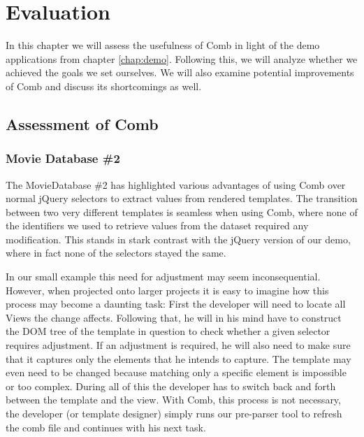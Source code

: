 \documentclass[thesis.tex]{subfiles}
\begin{document}
\chapter{Evaluation}
\label{chap:eval}


In this chapter we will assess the usefulness of Comb in light of the
demo applications from chapter \ref{chap:demo}.
Following this, we will analyze whether we achieved the goals we set ourselves.
We will also examine potential improvements of Comb and discuss its shortcomings
as well.




\section{Assessment of Comb}
\label{sec:assessment}

\subsection{Movie Database \#2}
\label{sec:asses-mdb}
The MovieDatabase \#2 has highlighted various advantages of using Comb over
normal jQuery selectors to extract values from rendered templates.
The transition between two very different templates is seamless when using Comb,
where none of the identifiers we used to retrieve values from the dataset
required any modification. This stands in stark contrast with the jQuery version
of our demo, where in fact none of the selectors stayed the same.

In our small example this need for adjustment may seem inconsequential.
However, when projected onto larger projects it is easy to imagine how this
process may become a daunting task: First the developer will need to locate all
Views the change affects. Following that, he will in his mind have to construct
the DOM tree of the template in question to check whether a given selector
requires adjustment.
If an adjustment is required, he will also need to make sure that
it captures only the elements that he intends to capture.
The template may even need to be changed because matching only a specific
element is impossible or too complex.
During all of this the developer has to switch back and forth between
the template and the view. With Comb, this process is not necessary, the
developer (or template designer) simply runs our pre-parser tool to refresh the
comb file and continues with his next task.
\end{document}
